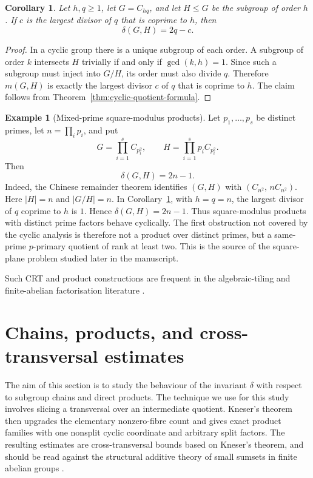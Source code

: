 \documentclass[reqno]{amsart}
\numberwithin{equation}{section}
\newtheorem{corollary}[theorem]{Corollary}
\theoremstyle{definition}
\newtheorem{example}[theorem]{Example}
\begin{document}
\begin{corollary}
\label{cor:cyclic-fixed-stage-formula}
Let $h,q\geq 1$, let $G=C_{hq}$, and let $H\leq G$ be the subgroup of order
$h$.  If $c$ is the largest divisor of $q$ that is coprime to $h$, then
\[
  \delta(G,H)=2q-c.
\]
\end{corollary}

\begin{proof}
In a cyclic group there is a unique subgroup of each order.  A subgroup of
order $k$ intersects $H$ trivially if and only if $\gcd(k,h)=1$.  Since such a
subgroup must inject into $G/H$, its order must also divide $q$.  Therefore
$m(G,H)$ is exactly the largest divisor $c$ of $q$ that is coprime to $h$.  The
claim follows from Theorem~\ref{thm:cyclic-quotient-formula}.
\end{proof}

\begin{example}[Mixed-prime square-modulus products]
\label{ex:mixed-prime-square-modulus-formula}
Let $p_1,\ldots,p_s$ be distinct primes, let $n=\prod_i p_i$, and put
\[
  G=\prod_{i=1}^s C_{p_i^2},
  \qquad
  H=\prod_{i=1}^s p_iC_{p_i^2}.
\]
Then
\[
  \delta(G,H)=2n-1.
\]
Indeed, the Chinese remainder theorem identifies $(G,H)$ with
$
  (C_{n^2},\,nC_{n^2}).
$
Here $|H|=n$ and $|G/H|=n$.  In
Corollary~\ref{cor:cyclic-fixed-stage-formula}, with $h=q=n$, the largest
divisor of $q$ coprime to $h$ is $1$.  Hence
$
  \delta(G,H)=2n-1
$.
Thus square-modulus products with distinct prime factors behave cyclically.  The
first obstruction not covered by the cyclic analysis is therefore not a product
over distinct primes, but a same-prime \(p\)-primary quotient of rank at least
two.  This is the source of the square-plane problem studied later in the manuscript.
\end{example}

Such CRT and product constructions are frequent in the algebraic-tiling
and finite-abelian factorisation literature
\cites{Stein1974,Dinitz2006FullRankTilings,SzaboSands2009FactoringGroups}.

\section{Chains, products, and cross-transversal estimates}
\label{sec:chains-products-kneser}

The aim of this section is to study the behaviour of the invariant $\delta$ with respect to subgroup chains and direct products.  The technique we use for this study involves
slicing a transversal over an intermediate quotient.  Kneser's theorem then
upgrades the elementary nonzero-fibre count and gives exact product families
with one nonsplit cyclic coordinate and arbitrary split factors. The resulting estimates are cross-transversal bounds based on Kneser's theorem, and
should be read against the structural additive theory of small sumsets in
finite abelian groups \cites{Kemperman1960,TaoVu2006,Grynkiewicz2013StructuralAdditiveTheory}.
\end{document}
